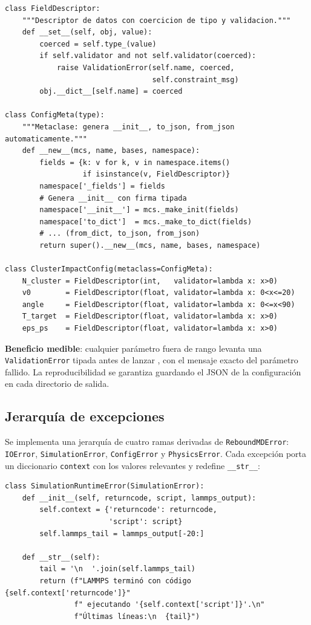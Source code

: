 \begin{lstlisting}[caption={Fragmento de \texttt{config.py}: metaclase y descriptor.},
                   label={lst:configmeta}]
class FieldDescriptor:
    """Descriptor de datos con coercicion de tipo y validacion."""
    def __set__(self, obj, value):
        coerced = self.type_(value)
        if self.validator and not self.validator(coerced):
            raise ValidationError(self.name, coerced,
                                  self.constraint_msg)
        obj.__dict__[self.name] = coerced

class ConfigMeta(type):
    """Metaclase: genera __init__, to_json, from_json automaticamente."""
    def __new__(mcs, name, bases, namespace):
        fields = {k: v for k, v in namespace.items()
                  if isinstance(v, FieldDescriptor)}
        namespace['_fields'] = fields
        # Genera __init__ con firma tipada
        namespace['__init__'] = mcs._make_init(fields)
        namespace['to_dict']  = mcs._make_to_dict(fields)
        # ... (from_dict, to_json, from_json)
        return super().__new__(mcs, name, bases, namespace)

class ClusterImpactConfig(metaclass=ConfigMeta):
    N_cluster = FieldDescriptor(int,   validator=lambda x: x>0)
    v0        = FieldDescriptor(float, validator=lambda x: 0<x<=20)
    angle     = FieldDescriptor(float, validator=lambda x: 0<=x<90)
    T_target  = FieldDescriptor(float, validator=lambda x: x>0)
    eps_ps    = FieldDescriptor(float, validator=lambda x: x>0)
\end{lstlisting}

\textbf{Beneficio medible}: cualquier parámetro fuera de rango levanta una
\verb|ValidationError| tipada antes de lanzar \lammps{}, con el mensaje exacto
del parámetro fallido. La reproducibilidad se garantiza guardando el JSON de
la configuración en cada directorio de salida.

\subsection{Jerarquía de excepciones}
\label{sec:excepciones}

Se implementa una jerarquía de cuatro ramas derivadas de
\verb|ReboundMDError|: \verb|IOError|, \verb|SimulationError|,
\verb|ConfigError| y \verb|PhysicsError|. Cada excepción porta un diccionario
\verb|context| con los valores relevantes y redefine \verb|__str__|:

\begin{lstlisting}[caption={Excepción con contexto estructurado.}]
class SimulationRuntimeError(SimulationError):
    def __init__(self, returncode, script, lammps_output):
        self.context = {'returncode': returncode,
                        'script': script}
        self.lammps_tail = lammps_output[-20:]

    def __str__(self):
        tail = '\n  '.join(self.lammps_tail)
        return (f"LAMMPS terminó con código {self.context['returncode']}"
                f" ejecutando '{self.context['script']}'.\n"
                f"Últimas líneas:\n  {tail}")
\end{lstlisting}

